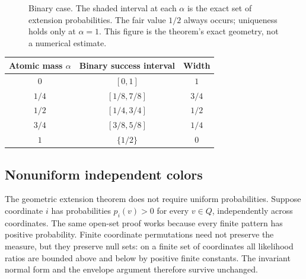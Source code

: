 \documentclass[11pt,letterpaper]{article}
\theoremstyle{definition}
\begin{document}
\begin{figure}[htbp]
\centering
{}
\caption{Binary case. The shaded interval at each $\alpha$ is the exact set of extension probabilities. The fair value $1/2$ always occurs; uniqueness holds only at $\alpha=1$. This figure is the theorem's exact geometry, not a numerical estimate.}
\label{mbg:ext:fig:band}
\end{figure}

\begin{center}
\begin{tabular}{ccc}
\toprule
Atomic mass $\alpha$ & Binary success interval & Width\\
\midrule
$0$ & $[0,1]$ & $1$\\
$1/4$ & $[1/8,7/8]$ & $3/4$\\
$1/2$ & $[1/4,3/4]$ & $1/2$\\
$3/4$ & $[3/8,5/8]$ & $1/4$\\
$1$ & $\{1/2\}$ & $0$\\
\bottomrule
\end{tabular}
\end{center}

\subsection{Nonuniform independent colors}

The geometric extension theorem does not require uniform probabilities. Suppose coordinate $i$ has probabilities $p_i(v)>0$ for every $v\in Q$, independently across coordinates. The same open-set proof works because every finite pattern has positive probability. Finite coordinate permutations need not preserve the measure, but they preserve null sets: on a finite set of coordinates all likelihood ratios are bounded above and below by positive finite constants. The invariant normal form and the envelope argument therefore survive unchanged.
\end{document}
